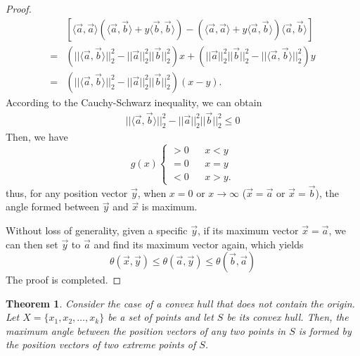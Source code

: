 \documentclass[10pt,twocolumn,letterpaper]{article}
\newtheorem{theorem}{Theorem}[subsection]
\newtheorem{proof}{Proof}[theorem]
\begin{document}
\begin{proof}
\begin{align*}
    & [\langle\vec{a},\vec{a}\rangle(\langle\vec{a},\vec{b}\rangle+y\langle\vec{b},\vec{b}\rangle)-(\langle\vec{a},\vec{a}\rangle+y\langle\vec{a},\vec{b}\rangle)\langle\vec{a},\vec{b}\rangle]\\
    =&(||\langle\vec{a},\vec{b}\rangle||_2^2-||\vec{a}||_2^2||\vec{b}||_2^2)x+(||\vec{a}||_2^2||\vec{b}||_2^2-||\langle\vec{a},\vec{b}\rangle||_2^2)y\\
    =&(||\langle\vec{a},\vec{b}\rangle||_2^2-||\vec{a}||_2^2||\vec{b}||_2^2)(x-y).
\end{align*}
According to the Cauchy-Schwarz inequality, we can obtain 
\begin{align*}
    ||\langle\vec{a},\vec{b}\rangle||_2^2-||\vec{a}||_2^2||\vec{b}||_2^2\leq0
\end{align*}
Then, we have
\begin{equation*}
g(x)\left\{
\begin{aligned}
>0 & &x<y\\
=0 & &x=y \\
<0 & &x>y.
\end{aligned}
\right.    
\end{equation*}
thus, for any position vector $\vec{y}$, when $x=0$ or $x\rightarrow \infty$ ($\Vec{x} =\vec{a}$ or $\Vec{x} =\vec{b}$), the angle formed between $\Vec{y}$ and $\vec{x}$ is maximum.

Without loss of generality, given a specific $\vec{y}$, if its maximum vector $\vec{x}=\vec{a}$, we can then set $\vec{y}$ to $\vec{a}$ and find its maximum vector again, which yields
\begin{equation*}    \theta(\vec{x},\vec{y})\leq\theta(\vec{a},\vec{y})\leq\theta(\vec{b},\vec{a})
\end{equation*}
The proof is completed.
\end{proof}

\begin{theorem}
\label{theo:gen}
Consider the case of a convex hull that does not contain the origin. Let $X = \{x_1, x_2, \dots, x_k\}$ be a set of points and let $S$ be its convex hull. Then, the maximum angle between the position vectors of any two points in $S$ is formed by the position vectors of two extreme points of $S$.
\end{theorem}
\end{document}
